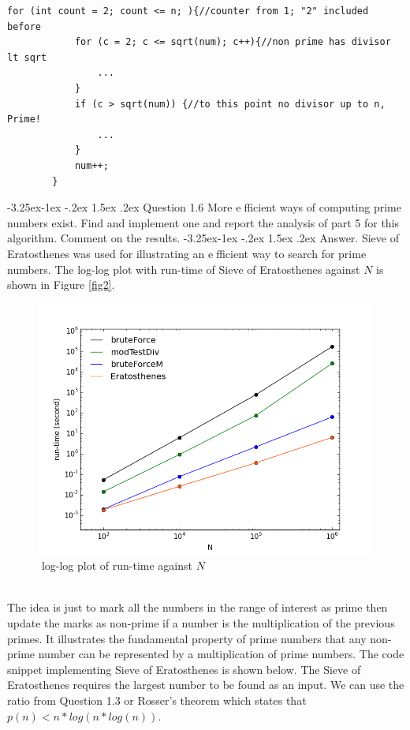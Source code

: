 \documentclass[a4paper,12pt]{article}%
\makeatletter
\renewcommand\subsection{\@startsection{subsection}{2}{\z@}%
                                     {-3.25ex\@plus -1ex \@minus -.2ex}%
                                     {1.5ex \@plus .2ex}%
                                     {\normalfont\bfseries}}
\renewcommand\subsubsection{\@startsection{subsection}{2}{\z@}%
                                     {-3.25ex\@plus -1ex \@minus -.2ex}%
                                     {1.5ex \@plus .2ex}%
                                     {\normalfont\bfseries\itshape}}%
\makeatother
\begin{document}
\begin{lstlisting}[title = $\lstinline{bruteForceM}$]
for (int count = 2; count <= n; ){//counter from 1; "2" included before
            for (c = 2; c <= sqrt(num); c++){//non prime has divisor lt sqrt
                ...
            }
            if (c > sqrt(num)) {//to this point no divisor up to n, Prime!
                ...
            }
            num++;  
        }
\end{lstlisting}
\subsection{Question 1.6}
More efficient ways of computing prime numbers exist. Find and implement one and report
the analysis of part 5 for this algorithm. Comment on the results.
\subsubsection{Answer.}
Sieve of Eratosthenes was used for illustrating an efficient way to search for prime numbers. The log-log plot with run-time of Sieve of Eratosthenes against $N$ is shown in Figure \eqref{fig2}.
\begin{figure}[h!]
\centering
\includegraphics[width=0.8\linewidth, height=0.5\linewidth]{rt-vs-n-eratos.png}
\caption{log-log plot of run-time against $N$}
\label{fig2}
\end{figure}\\
The idea is just to mark all the numbers in the range of interest as prime then update the marks as non-prime if a number is the multiplication of the previous primes. It illustrates the fundamental property of prime numbers that any non-prime number can be represented by a multiplication of prime numbers. The code snippet implementing Sieve of Eratosthenes is shown below. The Sieve of Eratosthenes requires the largest number to be found as an input. We can use the ratio from Question 1.3 or Rosser's theorem which states that $p(n) < n * log(n*log(n))$.\\\\
\end{document}
